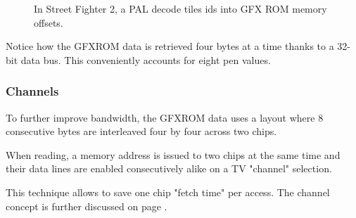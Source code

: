  \begin{figure}[H]%
 \caption*{In Street Fighter 2, a PAL  decode tiles ids into GFX ROM memory offsets.}%
 \end{figure}%

Notice how the GFXROM data is retrieved four bytes at a time thanks to a 32-bit data bus. This conveniently accounts for eight pen values.

\subsubsection{Channels}
To further improve bandwidth, the GFXROM data uses a layout where 8 consecutive bytes are interleaved four by four across two chips. 

When reading, a memory address is issued to two chips at the same time and their data lines are enabled consecutively alike on a TV "channel" selection.

This technique allows to save one chip "fetch time" per access. The channel concept is further discussed on page \pageref{channels}. 














